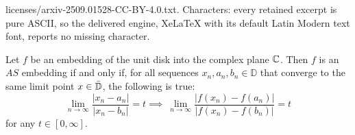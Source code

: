 \documentclass[10pt,a4paper]{amsart}
\newcommand{\C}{\Bbb{C}}
\newcommand{\Dc}{\Bar{\Bbb{D}}}
\newcommand{\D}{\mathbb{D}}
\newcommand{\abs}[1]{\lvert#1\rvert}
\begin{document}
licenses/arxiv-2509.01528-CC-BY-4.0.txt. Characters: every retained excerpt is pure ASCII, so the delivered engine, XeLaTeX with its default Latin Modern text font, reports no missing character.
\begin{pro}\label{proposition:sequences_AS}
    Let $f$ be an embedding of the unit disk into the complex plane $\C$. Then $f$ is an $AS$ embedding if and only if, for all sequences $x_n,a_n,b_n\in\D$ that converge to the same limit point $x\in\Dc$, the following is true: 
    \begin{equation}
    \lim_{n\rightarrow\infty}\frac{\abs{x_n-a_n}}{\abs{x_n-b_n}}= t \implies \ \lim_{n\rightarrow\infty} \frac{\abs{f(x_n)-f(a_n)}}{\abs{f(x_n)-f(b_n)}}=t
    \end{equation}
for any $t\in [0,\infty]$.
\end{pro}
\end{document}
